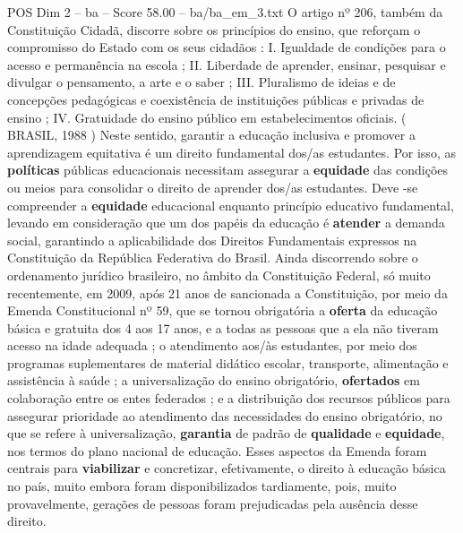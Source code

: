 \begin{textsample}{POS Dim 2 – ba – Score 58.00 – ba/ba\_em\_3.txt}
O artigo nº 206, também da Constituição Cidadã, discorre sobre os princípios do ensino, que reforçam o compromisso do Estado com os seus cidadãos : I.
Igualdade de condições para o acesso e permanência na escola ; II.
Liberdade de aprender, ensinar, pesquisar e divulgar o pensamento, a arte e o saber ; III.
Pluralismo de ideias e de concepções pedagógicas e coexistência de instituições públicas e privadas de ensino ; IV.
Gratuidade do ensino público em estabelecimentos oficiais. ( BRASIL, 1988 ) Neste sentido, garantir a educação inclusiva e promover a aprendizagem equitativa é um direito fundamental dos/as estudantes.
Por isso, as \textbf{políticas} públicas educacionais necessitam assegurar a \textbf{equidade} das condições ou meios para consolidar o direito de aprender dos/as estudantes.
Deve -se compreender a \textbf{equidade} educacional enquanto princípio educativo fundamental, levando em consideração que um dos papéis da educação é \textbf{atender} a demanda social, garantindo a aplicabilidade dos Direitos Fundamentais expressos na Constituição da República Federativa do Brasil.
Ainda discorrendo sobre o ordenamento jurídico brasileiro, no âmbito da Constituição Federal, só muito recentemente, em 2009, após 21 anos de sancionada a Constituição, por meio da Emenda Constitucional nº 59, que se tornou obrigatória a \textbf{oferta} da educação básica e gratuita dos 4 aos 17 anos, e a todas as pessoas que a ela não tiveram acesso na idade adequada ; o atendimento aos/às estudantes, por meio dos programas suplementares de material didático escolar, transporte, alimentação e assistência à saúde ; a universalização do ensino obrigatório, \textbf{ofertados} em colaboração entre os entes federados ; e a distribuição dos recursos públicos para assegurar prioridade ao atendimento das necessidades do ensino obrigatório, no que se refere à universalização, \textbf{garantia} de padrão de \textbf{qualidade} e \textbf{equidade}, nos termos do plano nacional de educação.
Esses aspectos da Emenda foram centrais para \textbf{viabilizar} e concretizar, efetivamente, o direito à educação básica no país, muito embora foram disponibilizados tardiamente, pois, muito provavelmente, gerações de pessoas foram prejudicadas pela ausência desse direito.

\end{textsample}
